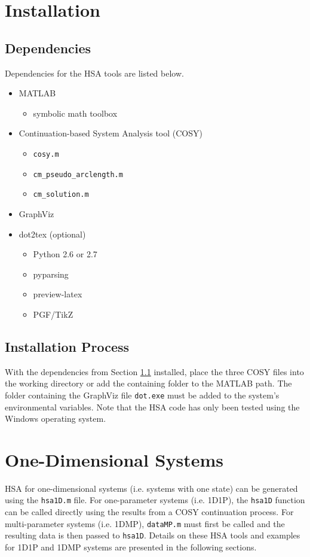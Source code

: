 \documentclass[12pt]{article}
\begin{document}
\section{Installation}

\subsection{Dependencies}
\label{dependencies}
Dependencies for the HSA tools are listed below. 

\begin{itemize}
\item MATLAB
	\begin{itemize}
	\item symbolic math toolbox
	\end{itemize}
\item Continuation-based System Analysis tool (COSY)
	\begin{itemize}
	\item \texttt{cosy.m}
	\item \texttt{cm\_pseudo\_arclength.m}
	\item \texttt{cm\_solution.m}
	\end{itemize}
\item GraphViz \cite{Gansner2000, Gansner2006, Ellson}
\item dot2tex (optional) \cite{Fauske}
	\begin{itemize}
	\item Python 2.6 or 2.7
	\item pyparsing
	\item preview-latex
	\item PGF/TikZ
	\end{itemize}
\end{itemize}

\subsection{Installation Process}
With the dependencies from Section \ref{dependencies} installed, place the three COSY files into the working directory or add the containing folder to the MATLAB path. The folder containing the GraphViz file \texttt{dot.exe} must be added to the system's environmental variables. Note that the HSA code has only been tested using the Windows operating system.


\section{One-Dimensional Systems}
HSA for one-dimensional systems (i.e. systems with one state) can be generated using the \texttt{hsa1D.m} file. For one-parameter systems (i.e. 1D1P), the \texttt{hsa1D} function can be called directly using the results from a COSY continuation process. For multi-parameter systems (i.e. 1DMP), \texttt{dataMP.m} must first be called and the resulting data is then passed to \texttt{hsa1D}. Details on these HSA tools and examples for 1D1P and 1DMP systems are presented in the following sections.
\end{document}

